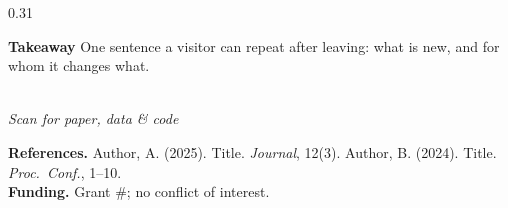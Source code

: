 \documentclass[final]{beamer}
\newcommand{\fHead}{\fontsize{44}{52}\selectfont\bfseries}
\newcommand{\fBody}{\fontsize{26}{34}\selectfont}
\newcommand{\fCaption}{\fontsize{20}{26}\selectfont\itshape}
\newcommand{\fRef}{\fontsize{18}{24}\selectfont}
\begin{document}
\begin{frame}[t]{}
\begin{columns}[t]
\begin{column}{0.31\textwidth}
  \begin{alertblock}{\fHead Takeaway}
    \fBody One sentence a visitor can repeat after leaving: what is
    new, and for whom it changes what.
  \end{alertblock}

  \begin{center}
    \\[2mm]
    {\fCaption \color{cGray} Scan for paper, data \& code}
  \end{center}

  {\fRef \color{cGray}
    \textbf{References.} Author, A. (2025). Title. \emph{Journal}, 12(3).
    Author, B. (2024). Title. \emph{Proc.\ Conf.}, 1--10.\\
    \textbf{Funding.} Grant \#; no conflict of interest.\par}
\end{column}

\end{columns}
\end{frame}
\end{document}
